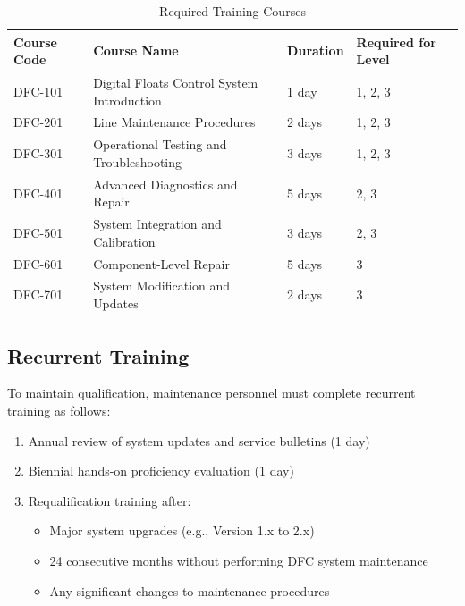 \documentclass[12pt,a4paper,twoside,openright]{book}
\newcommand{\tabletextfont}{\normalfont\rmfamily}
\newcommand{\tableheadfont}{\normalfont\bfseries}
\begin{document}
\begin{table}[h]
\centering
\setlength{\tabcolsep}{5pt} %
\begin{tabular}{|p{}|p{}|p{}|p{}|}
\hline
\tableheadfont\textbf{Course Code} & \tableheadfont\textbf{Course Name} & \tableheadfont\textbf{Duration} & \tableheadfont\textbf{Required for Level} \\
\hline
\tabletextfont DFC-101 & Digital Floats Control System Introduction & 1 day & 1, 2, 3 \\
\hline
\tabletextfont DFC-201 & Line Maintenance Procedures & 2 days & 1, 2, 3 \\
\hline
\tabletextfont DFC-301 & Operational Testing and Troubleshooting & 3 days & 1, 2, 3 \\
\hline
\tabletextfont DFC-401 & Advanced Diagnostics and Repair & 5 days & 2, 3 \\
\hline
\tabletextfont DFC-501 & System Integration and Calibration & 3 days & 2, 3 \\
\hline
\tabletextfont DFC-601 & Component-Level Repair & 5 days & 3 \\
\hline
\tabletextfont DFC-701 & System Modification and Updates & 2 days & 3 \\
\hline
\end{tabular}
\caption{Required Training Courses}
\end{table}

\subsection{Recurrent Training}

To maintain qualification, maintenance personnel must complete recurrent training as follows:

\begin{enumerate}
    \item Annual review of system updates and service bulletins (1 day)
    \item Biennial hands-on proficiency evaluation (1 day)
    \item Requalification training after:
    \begin{itemize}
        \item Major system upgrades (e.g., Version 1.x to 2.x)
        \item 24 consecutive months without performing DFC system maintenance
        \item Any significant changes to maintenance procedures
    \end{itemize}
\end{enumerate}
\end{document}
